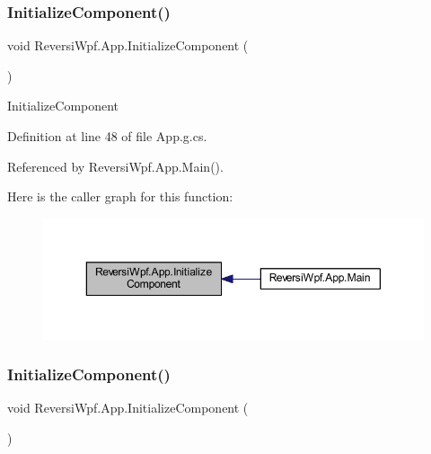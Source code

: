 \subsubsection{\texorpdfstring{Initialize\+Component()}{InitializeComponent()}\hspace{0.1cm}{\footnotesize\ttfamily [1/4]}}
{\footnotesize\ttfamily void Reversi\+Wpf.\+App.\+Initialize\+Component (\begin{DoxyParamCaption}{ }\end{DoxyParamCaption})}



Initialize\+Component 



Definition at line 48 of file App.\+g.\+cs.



Referenced by Reversi\+Wpf.\+App.\+Main().

Here is the caller graph for this function\+:\nopagebreak
\begin{figure}[H]
\begin{center}
\leavevmode
\includegraphics[width=350pt]{class_reversi_wpf_1_1_app_a30ccf063a596c89bd03747d60a96d084_icgraph}
\end{center}
\end{figure}
\mbox{\label{class_reversi_wpf_1_1_app_a30ccf063a596c89bd03747d60a96d084}} 
\subsubsection{\texorpdfstring{Initialize\+Component()}{InitializeComponent()}\hspace{0.1cm}{\footnotesize\ttfamily [2/4]}}
{\footnotesize\ttfamily void Reversi\+Wpf.\+App.\+Initialize\+Component (\begin{DoxyParamCaption}{ }\end{DoxyParamCaption})}



